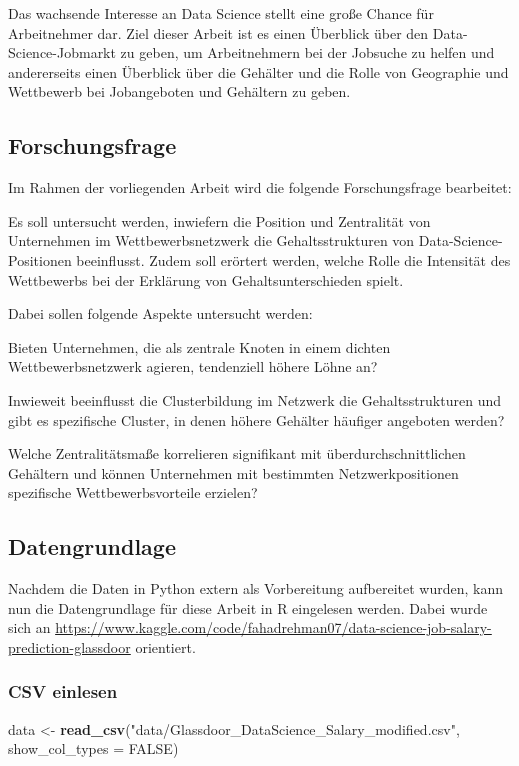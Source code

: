 \documentclass[
]{article}
\newenvironment{Shaded}{\begin{snugshade}}{\end{snugshade}}
\newcommand{\AttributeTok}[1]{\textcolor[rgb]{0.13,0.29,0.53}{#1}}
\newcommand{\ConstantTok}[1]{\textcolor[rgb]{0.56,0.35,0.01}{#1}}
\newcommand{\FunctionTok}[1]{\textcolor[rgb]{0.13,0.29,0.53}{\textbf{#1}}}
\newcommand{\NormalTok}[1]{#1}
\newcommand{\OtherTok}[1]{\textcolor[rgb]{0.56,0.35,0.01}{#1}}
\newcommand{\StringTok}[1]{\textcolor[rgb]{0.31,0.60,0.02}{#1}}
\begin{document}
Das wachsende Interesse an Data Science stellt eine große Chance für
Arbeitnehmer dar. Ziel dieser Arbeit ist es einen Überblick über den
Data-Science-Jobmarkt zu geben, um Arbeitnehmern bei der Jobsuche zu
helfen und andererseits einen Überblick über die Gehälter und die Rolle
von Geographie und Wettbewerb bei Jobangeboten und Gehältern zu geben.

\subsection{Forschungsfrage}\label{forschungsfrage}

Im Rahmen der vorliegenden Arbeit wird die folgende Forschungsfrage
bearbeitet:

Es soll untersucht werden, inwiefern die Position und Zentralität von
Unternehmen im Wettbewerbsnetzwerk die Gehaltsstrukturen von
Data-Science-Positionen beeinflusst. Zudem soll erörtert werden, welche
Rolle die Intensität des Wettbewerbs bei der Erklärung von
Gehaltsunterschieden spielt.

Dabei sollen folgende Aspekte untersucht werden:

Bieten Unternehmen, die als zentrale Knoten in einem dichten
Wettbewerbsnetzwerk agieren, tendenziell höhere Löhne an?

Inwieweit beeinflusst die Clusterbildung im Netzwerk die
Gehaltsstrukturen und gibt es spezifische Cluster, in denen höhere
Gehälter häufiger angeboten werden?

Welche Zentralitätsmaße korrelieren signifikant mit
überdurchschnittlichen Gehältern und können Unternehmen mit bestimmten
Netzwerkpositionen spezifische Wettbewerbsvorteile erzielen?

\subsection{Datengrundlage}\label{datengrundlage}

Nachdem die Daten in Python extern als Vorbereitung aufbereitet wurden,
kann nun die Datengrundlage für diese Arbeit in R eingelesen werden.
Dabei wurde sich an
\url{https://www.kaggle.com/code/fahadrehman07/data-science-job-salary-prediction-glassdoor}
orientiert.

\subsubsection{CSV einlesen}\label{csv-einlesen}

\begin{Shaded}
\begin{Highlighting}[]
\NormalTok{data }\OtherTok{\textless{}{-}} \FunctionTok{read\_csv}\NormalTok{(}\StringTok{"data/Glassdoor\_DataScience\_Salary\_modified.csv"}\NormalTok{, }\AttributeTok{show\_col\_types =} \ConstantTok{FALSE}\NormalTok{)}
\end{Highlighting}
\end{Shaded}
\end{document}
